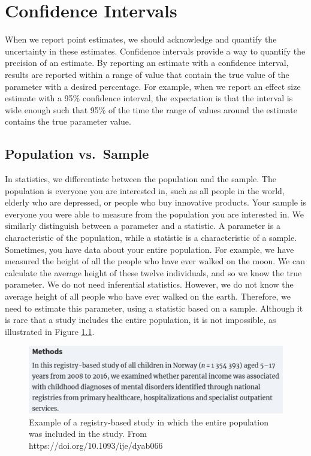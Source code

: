 \documentclass[
  oneside]{book}
\begin{document}
\hypertarget{confint}{%
\chapter{Confidence Intervals}\label{confint}}

When we report point estimates, we should acknowledge and quantify the uncertainty in these estimates. Confidence intervals provide a way to quantify the precision of an estimate. By reporting an estimate with a confidence interval, results are reported within a range of value that contain the true value of the parameter with a desired percentage. For example, when we report an effect size estimate with a 95\% confidence interval, the expectation is that the interval is wide enough such that 95\% of the time the range of values around the estimate contains the true parameter value.

\hypertarget{population-vs.-sample}{%
\section{Population vs.~Sample}\label{population-vs.-sample}}

In statistics, we differentiate between the population and the sample. The population is everyone you are interested in, such as all people in the world, elderly who are depressed, or people who buy innovative products. Your sample is everyone you were able to measure from the population you are interested in. We similarly distinguish between a parameter and a statistic. A parameter is a characteristic of the population, while a statistic is a characteristic of a sample. Sometimes, you have data about your entire population. For example, we have measured the height of all the people who have ever walked on the moon. We can calculate the average height of these twelve individuals, and so we know the true parameter. We do not need inferential statistics. However, we do not know the average height of all people who have ever walked on the earth. Therefore, we need to estimate this parameter, using a statistic based on a sample. Although it is rare that a study includes the entire population, it is not impossible, as illustrated in Figure \ref{fig:population}.

\begin{figure}

{\centering \includegraphics[width=1\linewidth]{images/population} 

}

\caption{Example of a registry-based study in which the entire population was included in the study. From https://doi.org/10.1093/ije/dyab066}\label{fig:population}
\end{figure}
\end{document}
